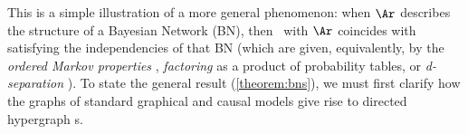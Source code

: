 This is a simple illustration of a more general
%
phenomenon: when $\Ar$ describes the structure of a
Bayesian Network (BN), then 
\scibility\ with $\Ar$ coincides with satisfying the independencies
    of that BN (which are given, equivalently, by the \emph{ordered Markov properties} \citep{lauritzen-dag-indeps}, 
    \emph{factoring} as a product of probability tables,
    or \emph{d-separation} \citep{geiger-pearl-d-separation}).
To state the general result (\cref{theorem:bns}),
    we must first 
    clarify how the graphs of standard graphical and causal models
    give rise to directed hypergraph s. 

%

